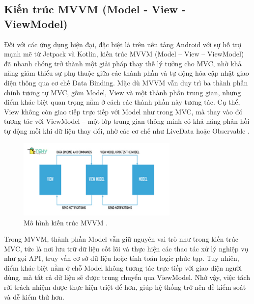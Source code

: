 \subsection{Kiến trúc MVVM (Model - View - ViewModel)}
\renewcommand{\labelitemi}{--}    
    
        Đối với các ứng dụng hiện đại, đặc biệt là trên nền tảng Android với sự hỗ trợ mạnh mẽ từ Jetpack và Kotlin, kiến trúc MVVM (Model – View – ViewModel) đã nhanh chóng trở thành một giải pháp thay thế lý tưởng cho MVC, nhờ khả năng giảm thiểu sự phụ thuộc giữa các thành phần và tự động hóa cập nhật giao diện thông qua cơ chế Data Binding. Mặc dù MVVM vẫn duy trì ba thành phần chính tương tự MVC, gồm Model, View và một thành phần trung gian, nhưng điểm khác biệt quan trọng nằm ở cách các thành phần này tương tác. Cụ thể, View không còn giao tiếp trực tiếp với Model như trong MVC, mà thay vào đó tương tác với ViewModel – một lớp trung gian thông minh có khả năng phản hồi tự động mỗi khi dữ liệu thay đổi, nhờ các cơ chế như LiveData hoặc Observable \cite{livedata-observable}.
    \vspace{0.5em}

\begin{figure}[H]
  \centering
  \includegraphics[width=0.7\textwidth]{images/mvvm.jpg}
  \caption{Mô hình kiến trúc MVVM \cite{tekyMVVM}.}
  \label{fig:fig18}
\end{figure}

    
      Trong MVVM, thành phần Model vẫn giữ nguyên vai trò như trong kiến trúc MVC, tức là nơi lưu trữ dữ liệu cốt lõi và thực hiện các thao tác xử lý nghiệp vụ như gọi API, truy vấn cơ sở dữ liệu hoặc tính toán logic phức tạp. Tuy nhiên, điểm khác biệt nằm ở chỗ Model không tương tác trực tiếp với giao diện người dùng, mà tất cả dữ liệu sẽ được trung chuyển qua ViewModel. Nhờ vậy, việc tách rời trách nhiệm được thực hiện triệt để hơn, giúp hệ thống trở nên dễ kiểm soát và dễ kiểm thử hơn.
    \vspace{0.5em}

